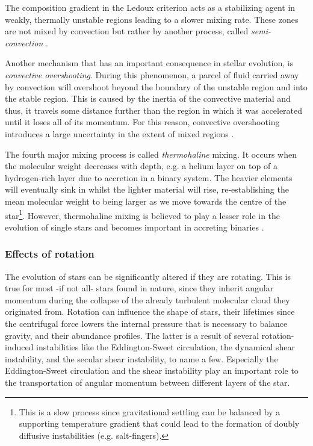 \documentclass[../../main/thesis_msc.tex]{subfiles}
\begin{document}
						The composition gradient in the Ledoux criterion acts as a stabilizing agent in weakly, thermally unstable regions leading to a slower mixing rate. These zones are not mixed by convection but rather by another process, called \emph{semi-convection} \citep[see][]{Spruit2013, Langer1983, Langer1991}.
						
						Another mechanism that has an important consequence in stellar evolution, is \emph{convective overshooting}. During this phenomenon, a parcel of fluid carried away by convection will overshoot beyond the boundary of the unstable region and into the stable region. This is caused by the inertia of the convective material and thus, it travels some distance further than the region in which it was accelerated until it loses all of its momentum. For this reason, convective overshooting introduces a large uncertainty in the extent of mixed regions \citep[see][for a detailed discussion on the effects of overshooting]{Saslaw1965, Stothers1990, Roxburgh1998}.
						
						The fourth major mixing process is called \emph{thermohaline} mixing. It occurs when the molecular weight decreases with depth, e.g. a helium layer on top of a hydrogen-rich layer due to accretion in a binary system. The heavier elements will eventually sink in whilst the lighter material will rise, re-establishing the mean molecular weight to being larger as we move towards the centre of the star\footnote{This is a slow process since gravitational settling can be balanced by a supporting temperature gradient that could lead to the formation of doubly diffusive instabilities (e.g. salt-fingers).}. However, thermohaline mixing is believed to play a lesser role in the evolution of single stars and becomes important in accreting binaries \citep[see also][]{Cantiello, Charbonnel}.
		
						
						
						
						
					\subsubsection{Effects of rotation}
					
						The evolution of stars can be significantly altered if they are rotating. This is true for most -if not all- stars found in nature, since they inherit angular momentum during the collapse of the already turbulent molecular cloud they originated from. Rotation can influence the shape of stars, their lifetimes since the centrifugal force lowers the internal pressure that is necessary to balance gravity, and their abundance profiles. The latter is a result of several rotation-induced instabilities like the Eddington-Sweet circulation, the dynamical shear instability, and the secular shear instability, to name a few. Especially the Eddington-Sweet circulation and the shear instability play an important role to the transportation of angular momentum between different layers of the star. 
						
\end{document}
